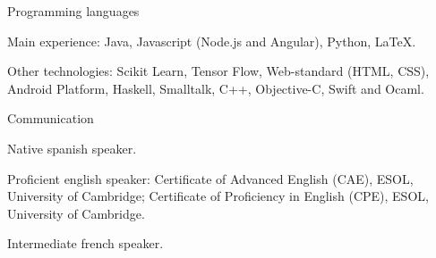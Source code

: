 

\begin{cventries}

\cventry
{Programming languages} %
{} %
{} %
{} %
{
  \begin{cvitems} %
    \item Main experience: Java, Javascript (Node.js and Angular), Python, \LaTeX.
    \item Other technologies: Scikit Learn, Tensor Flow, Web-standard (HTML, CSS), Android Platform, Haskell, Smalltalk, C++, Objective-C, Swift and Ocaml.
  \end{cvitems}
}

\cventry
{Communication} %
{} %
{} %
{} %
{
  \begin{cvitems} %
    \item Native spanish speaker. 
    \item Proficient english speaker: Certificate of Advanced English (CAE), ESOL, University of Cambridge; Certificate of Proficiency in English (CPE), ESOL, University of Cambridge.
    \item Intermediate french speaker.
  \end{cvitems}
}

\end{cventries}
